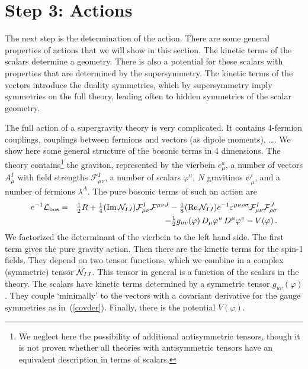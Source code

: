 \documentclass[a4paper,11pt,twoside]{article}
\newcommand{\Red}[1]{#1}
\newcommand{\Blue}[1]{#1}
\newcommand{\Maroon}[1]{#1}
\newcommand{\ft}[2]{{\textstyle\frac{#1}{#2}}}
\def\Re{\mathop{\rm Re}\nolimits}
\def\Im{\mathop{\rm Im}\nolimits}
\begin{document}
\section{Step 3: Actions} \label{ss:actions}

The next step is the determination of the action. There are some general
properties of actions that we will show in this section. The kinetic
terms of the scalars determine a geometry. There is also a potential for
these scalars with properties that are determined by the supersymmetry.
The kinetic terms of the vectors introduce the duality symmetries, which
by supersymmetry imply symmetries on the full theory, leading often to
hidden symmetries of the scalar geometry.

The full action of a supergravity theory is very complicated. It contains
4-fermion couplings, couplings between fermions and vectors (as dipole
moments), \ldots . We show here some general structure of the bosonic
terms in 4 dimensions. The theory contains\footnote{We neglect here the
possibility of additional antisymmetric tensors, though it is not proven
whether all theories with antisymmetric tensors have an equivalent
description in terms of scalars.} the graviton, represented by the
vierbein $e_\mu ^a$, a number of vectors $A_\mu ^I$ with field strengths
$\mathcal{F}_{\mu \nu }^I$, a number of scalars $\Red{\varphi ^u}$, $N$
gravitinos $\Blue{\psi^i _\mu}$, and a number of fermions $\Blue{\lambda
^A}$. The pure bosonic terms of such an action are
\begin{eqnarray}
 e^{-1}{\cal L}_{\rm bos}  &=& \ft12R+\ft14 (\Red{\Im {\cal N}_{IJ}}){\cal F}_{\mu\nu}^I {\cal F}^{\mu\nu
J} -\ft 18 (\Red{\Re {\cal N}_{IJ}})e^{-1}
\varepsilon^{\mu\nu\rho\sigma}{\cal
F}_{\mu\nu}^I {\cal F}_{\rho\sigma}^J \nonumber\\
&&   -\ft12 \Red{g_{uv}(\varphi)}\,D_\mu \Red{\varphi^u}\, D^\mu
\Red{\varphi^v}
   -\Maroon{V}\Red{(\varphi)}\,. \label{generalbosL}
\end{eqnarray}
We factorized the determinant of the vierbein to the left hand side. The
first term gives the pure gravity action. Then there are the kinetic
terms for the spin-1 fields. They depend on two tensor functions, which
we combine in a complex (symmetric) tensor $\Red{{\cal N}_{IJ}}$. This
tensor in general is a function of the scalars in the theory. The scalars
have kinetic terms determined by a symmetric tensor
$\Red{g_{uv}(\varphi)}$. They couple `minimally' to the vectors with a
covariant derivative for the gauge symmetries as in~(\ref{covder}).
Finally, there is the potential $\Maroon{V}\Red{(\varphi)}$.
\end{document}
